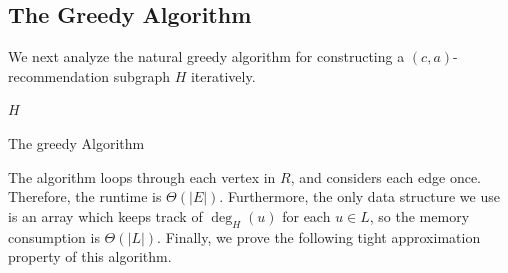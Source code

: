 \subsection{The Greedy Algorithm}
\label{greedy}

We next analyze the natural greedy algorithm for constructing a $(c,a)$-recommendation
subgraph $H$ iteratively. \vspace{0.05in}

\begin{algorithm}[h]
  \SetAlgoLined
  \Return $H$\;
  \caption{The greedy Algorithm}
\end{algorithm}\vs

The algorithm loops through each vertex in $R$, and considers each edge once.
Therefore, the runtime is $\Theta(|E|)$. Furthermore, the only data structure
we use is an array which keeps track of $\deg_H(u)$ for each $u\in L$, so the
memory consumption is $\Theta(|L|)$. Finally, we prove the following tight
approximation property of this algorithm.

